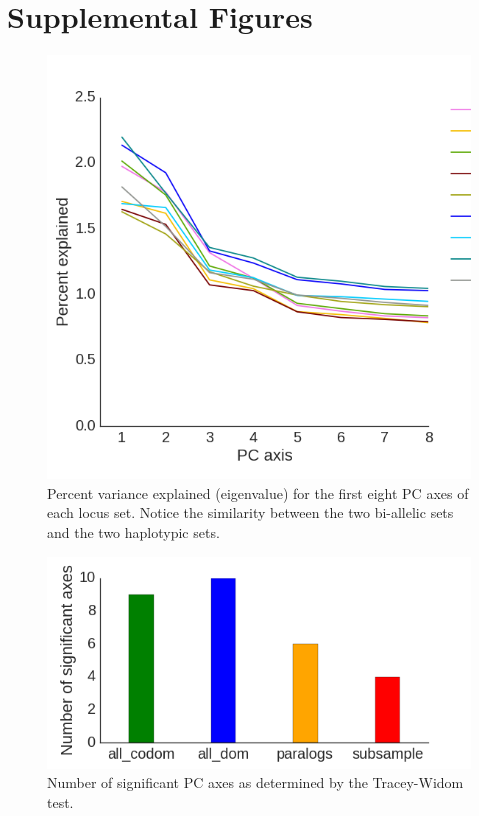 \documentclass[12pt, one column]{article}
\begin{document}
\pagebreak
\section*{Supplemental Figures}

\begin{figure}[H]
\includegraphics[scale=.4]{figures/supplemental/PCA_eigenvalues.png}
\caption{Percent variance explained (eigenvalue) for the first eight PC axes of each locus set.  Notice the similarity between the two bi-allelic sets and the two haplotypic sets.}
\end{figure}

\begin{figure}[H]
\includegraphics[scale=.4]{figures/supplemental/TW_stats.png}
\caption{Number of significant PC axes as determined by the Tracey-Widom test.}
\end{figure}
\end{document}
